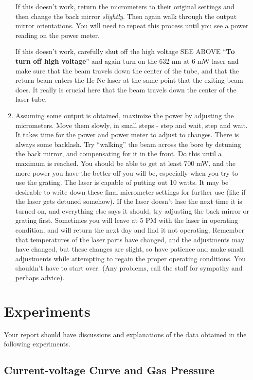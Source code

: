 \documentclass{../lab}
\begin{document}
\begin{enumerate}
    If this doesn't work, return the micrometers to their original settings and then change the back mirror \emph{slightly}. Then again walk through the output mirror orientations. You will need to repeat this process until you see a power reading on the power meter.
    
    If this doesn't work, carefully shut off the high voltage SEE ABOVE ``\textbf{To turn off high voltage}'' and again turn on the 632 nm at 6 mW laser and make sure that the beam travels down the center of the tube, and that the return beam enters the He-Ne laser at the same point that the exiting beam does. It really is crucial here that the beam travels down the center of the laser tube.
    
    \item Assuming some output is obtained, maximize the power by adjusting the micrometers. Move them slowly, in small steps - step and wait, step and wait. It takes time for the power and power meter to adjust to changes. There is always some backlash. Try ``walking'' the beam across the bore by detuning the back mirror, and compensating for it in the front. Do this until a maximum is reached. You should be able to get at least 700 mW, and the more power you have the better-off you will be, especially when you try to use the grating. The laser is capable of putting out 10 watts. It may be desirable to write down these final micrometer settings for further use (like if the laser gets detuned somehow). If the laser doesn't lase the next time it is turned on, and everything else says it should, try adjusting the back mirror or grating first. Sometimes you will leave at 5 PM with the laser in operating condition, and will return the next day and find it not operating. Remember that temperatures of the laser parts have changed, and the adjustments may have changed, but these changes are slight, so have patience and make small adjustments while attempting to regain the proper operating conditions. You shouldn't have to start over. (Any problems, call the staff for sympathy and perhaps advice).
\end{enumerate}

\section{Experiments}

Your report should have discussions and explanations of the data obtained in the following experiments.

\subsection{Current-voltage Curve and Gas Pressure}
\end{document}
